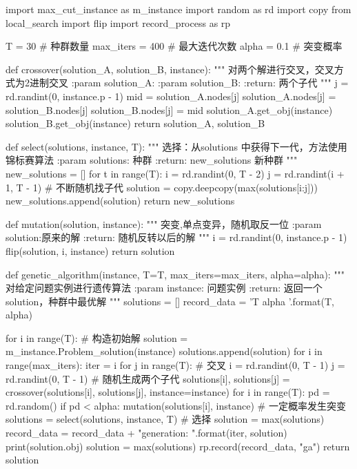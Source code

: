 \documentclass{article}
\begin{document}
    \begin{python}
import max_cut_instance as m_instance
import random as rd
import copy
from local_search import flip
import record_process as rp

T = 30  # 种群数量
max_iters = 400  # 最大迭代次数
alpha = 0.1  # 突变概率


def crossover(solution_A, solution_B, instance):
    """
    对两个解进行交叉，交叉方式为2进制交叉
    :param solution_A:
    :param solution_B:
    :return: 两个子代
    """
    j = rd.randint(0, instance.p - 1)
    mid = solution_A.nodes[j]
    solution_A.nodes[j] = solution_B.nodes[j]
    solution_B.nodes[j] = mid
    solution_A.get_obj(instance)
    solution_B.get_obj(instance)
    return solution_A, solution_B


def select(solutions, instance, T):
    """
    选择：从solutions 中获得下一代，方法使用锦标赛算法
    :param solutions: 种群
    :return: new_solutions 新种群
    """
    new_solutions = []
    for t in range(T):
        i = rd.randint(0, T - 2)
        j = rd.randint(i + 1, T - 1)  # 不断随机找子代
        solution = copy.deepcopy(max(solutions[i:j]))
        new_solutions.append(solution)
    return new_solutions


def mutation(solution, instance):
    """
    突变,单点变异，随机取反一位
    :param solution:原来的解
    :return: 随机反转以后的解
    """
    i = rd.randint(0, instance.p - 1)
    flip(solution, i, instance)
    return solution


def genetic_algorithm(instance, T=T, max_iters=max_iters, alpha=alpha):
    """
    对给定问题实例进行遗传算法
    :param instance: 问题实例
    :return: 返回一个solution，种群中最优解
    """
    solutions = []
    record_data = 'T {} alpha {}\n\n'.format(T, alpha)

    for i in range(T):  # 构造初始解
        solution = m_instance.Problem_solution(instance)
        solutions.append(solution)
    for i in range(max_iters):
        iter = i
        for j in range(T):  # 交叉
            i = rd.randint(0, T - 1)
            j = rd.randint(0, T - 1)  # 随机生成两个子代
            solutions[i], solutions[j] = crossover(solutions[i], solutions[j], instance=instance)
        for i in range(T):
            pd = rd.random()
            if pd < alpha:
                mutation(solutions[i], instance)  # 一定概率发生突变
        solutions = select(solutions, instance, T)  # 选择
        solution = max(solutions)
        record_data = record_data + "generation: {}\n{}\n\n".format(iter, solution)
        print(solution.obj)
    solution = max(solutions)
    rp.record(record_data, "ga")
    return solution
    \end{python}
\end{document}
